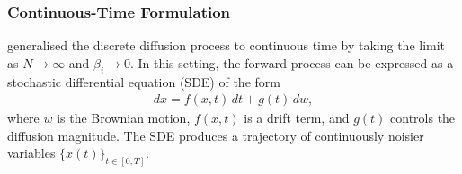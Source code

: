 \documentclass[a4paper,12pt]{article}
\begin{document}
\subsubsection{Continuous-Time Formulation}\label{sec:forward-SDE-continuous}
\citet{song2021ScoreBasedGenerativeModeling} generalised the discrete diffusion process to continuous time by taking the limit as \(N \to \infty\) and \(\beta_i \to 0\). In this setting, the forward process can be expressed as a stochastic differential equation (SDE) of the form
\begin{align}\label{eq:forward_sde}
    dx = f(x,t)\,dt + g(t)\,dw,
\end{align}
where \(w\) is the Brownian motion, \(f(x,t)\) is a drift term, and \(g(t)\) controls the diffusion magnitude. The SDE produces a trajectory of continuously noisier variables \(\{x(t)\}_{t \in [0,T]}\).
\end{document}
